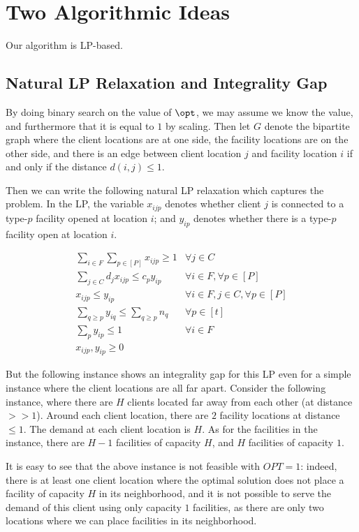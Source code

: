 \section{Two Algorithmic Ideas}
Our algorithm is LP-based.

\subsection{Natural LP Relaxation and Integrality Gap}
By doing binary search on the value of $\opt$, we may assume we know the value, and furthermore that it is equal to $1$ by scaling. Then let $G$ denote the bipartite graph where the client locations are at one side, the facility locations are on the other side, and there is an edge between client location $j$ and facility location $i$ if and only if the distance $d(i,j) \leq 1$.

Then we can write the following natural LP relaxation which captures the \mckc problem. In the LP, the variable $x_{ijp}$ denotes whether client $j$ is connected to a type-$p$ facility opened at location $i$; and $y_{ip}$ denotes whether there is a type-$p$ facility open at location $i$.

\begin{eqnarray}
\sum_{i\in F} \sum_{p\in [P]}  x_{ijp} \geq 1 & \forall j\in C  \label{eq:badlp1} \\
\sum_{j\in C} d_j x_{ijp} \leq c_p y_{ip} & \forall i \in F, \forall p\in [P] \label{eq:badlp2} \\
x_{ijp} \leq y_{ip} & \forall i\in F, j\in C,\forall p\in [P] \label{eq:badlp3}\\
\sum_{q \geq p} y_{iq}   \leq \sum_{q\geq p} n_q & \forall p\in [t] \label{eq:badlp4}\\
\sum_{p} y_{ip} \leq 1 & \forall i \in F \label{eq:badlp5} \\
x_{ijp}, y_{ip} \geq 0
\end{eqnarray}


But the following instance shows an integrality gap for this LP even for a simple instance where the client locations are all far apart.
Consider the following instance, where there are $H$ clients located far away from each other (at distance $>> 1$). Around each client location, there are $2$ facility locations at distance $\leq 1$. The demand at each client location is $H$. As for the facilities in the instance, there are $H-1$ facilities of capacity $H$, and $H$ facilities of capacity $1$.

It is easy to see that the above instance is not feasible with $OPT=1$: indeed, there is at least one client location where the optimal solution does not place a facility of capacity $H$ in its neighborhood, and it is not possible to serve the demand of this client using only capacity $1$ facilities, as there are only two locations where we can place facilities in its neighborhood.

